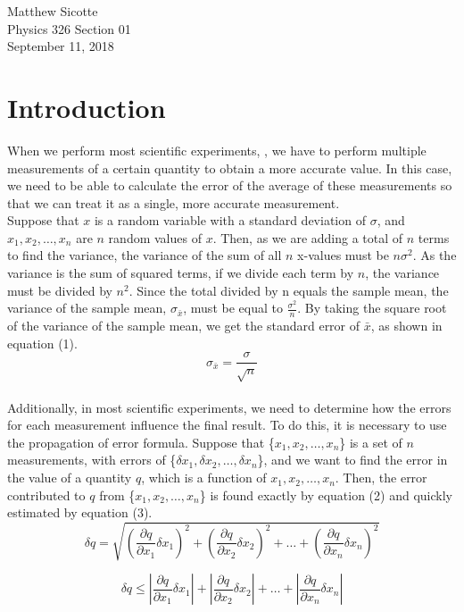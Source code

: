 \documentclass{article}
\begin{document}
\begin{flushright}
Matthew Sicotte\\
Physics 326 Section 01\\
September 11, 2018
\end{flushright}
\section*{Introduction}
When we perform most scientific experiments, , we have to perform multiple measurements of a certain quantity to obtain a more accurate value.  In this case, we need to be able to calculate the error of the average of these measurements so that we can treat it as a single, more accurate measurement.\\

Suppose that $x$ is a random variable with a standard deviation of $\sigma$, and ${x_1, x_2, \ldots, x_n}$ are $n$ random values of $x$.  Then, as we are adding a total of $n$ terms to find the variance, the variance of the sum of all $n$ x-values must be $n\sigma^2$.  As the variance is the sum of squared terms, if we divide each term by $n$, the variance must be divided by $n^2$.  Since the total divided by n equals the sample mean, the variance of the sample mean, $\sigma_{\bar{x}}$, must be equal to $\frac{\sigma^2}{n}$.  By taking the square root of the variance of the sample mean, we get the standard error of $\bar{x}$, as shown in equation (1).
\begin{equation}
	\sigma_{\bar{x}}=\frac{\sigma}{\sqrt{n}}
\end{equation}\\

Additionally, in most scientific experiments, we need to determine how the errors for each measurement influence the final result.  To do this, it is necessary to use the propagation of error formula.  Suppose that \{$x_1, x_2, \ldots, x_n$\} is a set of $n$ measurements, with errors of \{$\delta x_1, \delta x_2, \ldots, \delta x_n$\}, and we want to find the error in the value of a quantity $q$, which is a function of $x_1, x_2, \ldots, x_n$.  Then, the error contributed to $q$ from \{$x_1, x_2, \ldots, x_n$\} is found exactly by equation (2) and quickly estimated by equation (3).
\begin{equation}
	\delta q=\sqrt{(\frac{\partial q}{\partial x_1}\delta x_1)^2+(\frac{\partial q}{\partial x_2}\delta x_2)^2+\ldots+(\frac{\partial q}{\partial x_n}\delta x_n)^2}
\end{equation}

\begin{equation}
	\delta q \leq |\frac{\partial q}{\partial x_1}\delta x_1|+|\frac{\partial q}{\partial x_2}\delta x_2|+\ldots + |\frac{\partial q}{\partial x_n}\delta x_n|
\end{equation}
\end{document}
